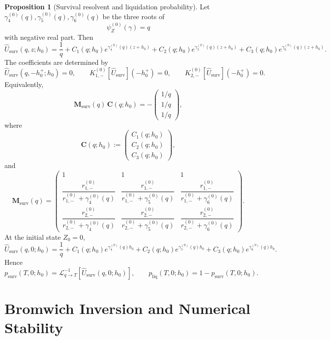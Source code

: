 \documentclass{article}
\theoremstyle{definition}
\newtheorem{proposition}{Proposition}[section]
\begin{document}
\begin{proposition}[Survival resolvent and liquidation probability]\label{prop:survival}
Let $\gamma_4^{(0)}(q),\gamma_5^{(0)}(q),\gamma_6^{(0)}(q)$ be the three roots of
\[
\psi_Z^{(0)}(\gamma)=q
\]
with negative real part. Then
\[
\boxed{
\widehat U_{\mathrm{surv}}(q,z;h_0)
=
\frac{1}{q}
+
C_1(q;h_0)e^{\gamma_4^{(0)}(q)(z+h_0)}
+
C_2(q;h_0)e^{\gamma_5^{(0)}(q)(z+h_0)}
+
C_3(q;h_0)e^{\gamma_6^{(0)}(q)(z+h_0)}.
}
\]
The coefficients are determined by
\[
\widehat U_{\mathrm{surv}}(q,-h_0^+;h_0)=0,
\qquad
K_{1,-}^{(0)}[\widehat U_{\mathrm{surv}}](-h_0^+)=0,
\qquad
K_{2,-}^{(0)}[\widehat U_{\mathrm{surv}}](-h_0^+)=0.
\]
Equivalently,
\[
\mathbf M_{\mathrm{surv}}(q)\,\mathbf C(q;h_0)
=
-
\begin{pmatrix}
1/q\\
1/q\\
1/q
\end{pmatrix},
\]
where
\[
\mathbf C(q;h_0):=
\begin{pmatrix}
C_1(q;h_0)\\
C_2(q;h_0)\\
C_3(q;h_0)
\end{pmatrix},
\]
and
\[
\mathbf M_{\mathrm{surv}}(q)=
\begin{pmatrix}
1 & 1 & 1\\[6pt]
\dfrac{r_{1,-}^{(0)}}{r_{1,-}^{(0)}+\gamma_4^{(0)}(q)} &
\dfrac{r_{1,-}^{(0)}}{r_{1,-}^{(0)}+\gamma_5^{(0)}(q)} &
\dfrac{r_{1,-}^{(0)}}{r_{1,-}^{(0)}+\gamma_6^{(0)}(q)}\\[12pt]
\dfrac{r_{2,-}^{(0)}}{r_{2,-}^{(0)}+\gamma_4^{(0)}(q)} &
\dfrac{r_{2,-}^{(0)}}{r_{2,-}^{(0)}+\gamma_5^{(0)}(q)} &
\dfrac{r_{2,-}^{(0)}}{r_{2,-}^{(0)}+\gamma_6^{(0)}(q)}
\end{pmatrix}.
\]
At the initial state $Z_0=0$,
\[
\widehat U_{\mathrm{surv}}(q,0;h_0)
=
\frac{1}{q}
+
C_1(q;h_0)e^{\gamma_4^{(0)}(q)h_0}
+
C_2(q;h_0)e^{\gamma_5^{(0)}(q)h_0}
+
C_3(q;h_0)e^{\gamma_6^{(0)}(q)h_0}.
\]
Hence
\[
p_{\mathrm{surv}}(T,0;h_0)
=
\mathcal L^{-1}_{q\to T}\!\left[\widehat U_{\mathrm{surv}}(q,0;h_0)\right],
\qquad
p_{\mathrm{liq}}(T,0;h_0)=1-p_{\mathrm{surv}}(T,0;h_0).
\]
\end{proposition}

\section{Bromwich Inversion and Numerical Stability}
\end{document}
